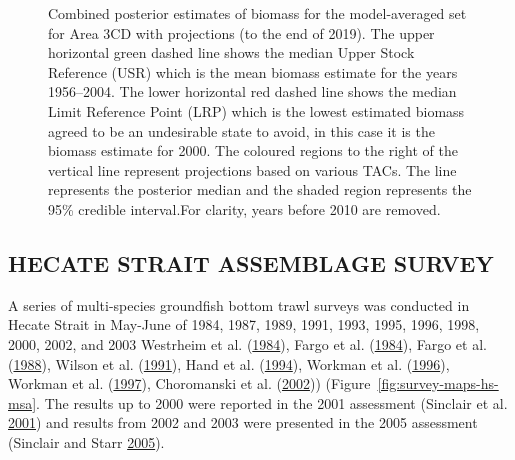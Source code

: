 \documentclass[11pt]{book}
\begin{document}
\clearpage
\begin{figure}[htb]

{\centering {} 

}

\caption{Combined posterior estimates of biomass for the model-averaged set for Area 3CD with projections (to the end of 2019).  The upper horizontal green dashed line shows the median Upper Stock Reference (USR) which is the mean biomass estimate for the years 1956--2004. The lower horizontal red dashed line shows the median Limit Reference Point (LRP) which is the lowest estimated biomass agreed to be an undesirable state to avoid, in this case it is the biomass estimate for 2000. The coloured regions to the right of the vertical line represent projections based on various TACs. The line represents the posterior median and the shaded region represents the 95\% credible interval.For clarity, years before 2010 are removed.}\label{fig:fig-model-average-biomass-3cd-proj}
\end{figure}
\clearpage

\Appendices


\clearpage

\label{app:survey-appendix}

\hypertarget{canadian-surveys}{%
\label{canadian-surveys}}

\hypertarget{hecate-strait-assemblage-survey}{%
\subsection{HECATE STRAIT ASSEMBLAGE SURVEY}\label{hecate-strait-assemblage-survey}}

A series of multi-species groundfish bottom trawl surveys was conducted in Hecate Strait in May-June of 1984, 1987, 1989, 1991, 1993, 1995, 1996, 1998, 2000, 2002, and 2003 Westrheim et al. (\protect\hyperlink{ref-westrheim1984}{1984}), Fargo et al. (\protect\hyperlink{ref-fargo1984}{1984}), Fargo et al. (\protect\hyperlink{ref-fargo1988}{1988}), Wilson et al. (\protect\hyperlink{ref-wilson1991}{1991}), Hand et al. (\protect\hyperlink{ref-hand1994}{1994}), Workman et al. (\protect\hyperlink{ref-workman1996}{1996}), Workman et al. (\protect\hyperlink{ref-workman1997}{1997}), Choromanski et al. (\protect\hyperlink{ref-choromanski2002}{2002})) (Figure~\ref{fig:survey-maps-hs-msa}. The results up to 2000 were reported in the 2001 assessment (Sinclair et al. \protect\hyperlink{ref-sinclair2001}{2001}) and results from 2002 and 2003 were presented in the 2005 assessment (Sinclair and Starr \protect\hyperlink{ref-sinclair2005}{2005}).
\end{document}
